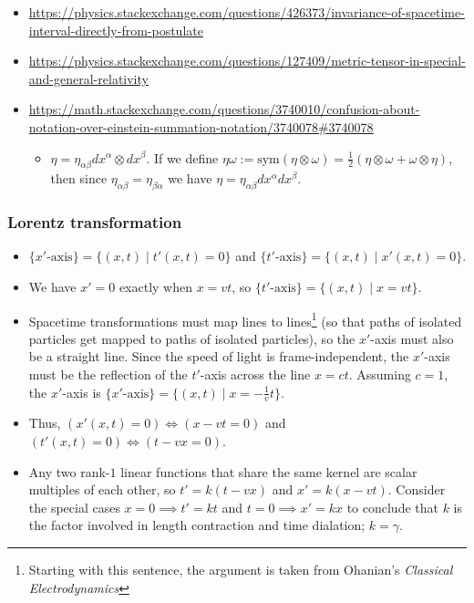 \documentclass{article}
\begin{document}
\begin{itemize}
    \item \url{https://physics.stackexchange.com/questions/426373/invariance-of-spacetime-interval-directly-from-postulate}
    \item \url{https://physics.stackexchange.com/questions/127409/metric-tensor-in-special-and-general-relativity}
    \item \url{https://math.stackexchange.com/questions/3740010/confusion-about-notation-over-einstein-summation-notation/3740078#3740078}
    \begin{itemize}
        \item $\eta = \eta_{\alpha \beta} dx^\alpha \otimes dx^\beta$. If we define $\eta \omega := \text{sym}(\eta \otimes \omega) = \frac{1}{2}(\eta \otimes \omega + \omega \otimes \eta)$, then since $\eta_{\alpha \beta} = \eta_{\beta \alpha}$ we have $\eta = \eta_{\alpha \beta} dx^\alpha dx^\beta$.
    \end{itemize}
\end{itemize}

\subsubsection*{Lorentz transformation}

\begin{itemize}
    \item $\{\text{$x'$-axis}\} = \{(x, t) \mid t'(x, t) = 0\}$ and $\{\text{$t'$-axis}\} = \{(x, t) \mid x'(x, t) = 0\}$. 
    \item We have $x' = 0$ exactly when $x = vt$, so $\{\text{$t'$-axis}\} = \{(x, t) \mid x = vt\}$.
    \item Spacetime transformations must map lines to lines\footnote{Starting with this sentence, the argument is taken from Ohanian's \textit{Classical Electrodynamics}} (so that paths of isolated particles get mapped to paths of isolated particles), so the $x'$-axis must also be a straight line. Since the speed of light is frame-independent, the $x'$-axis must be the reflection of the $t'$-axis across the line $x = ct$. Assuming $c = 1$, the $x'$-axis is $\{\text{$x'$-axis}\} = \{(x, t) \mid x = -\frac{1}{v}t \}$.
    \item Thus, $(x'(x, t) = 0) \iff (x - vt = 0)$ and $(t'(x, t) = 0) \iff (t - vx = 0)$.
    \item Any two rank-$1$ linear functions that share the same kernel are scalar multiples of each other, so $t' = k(t - vx)$ and $x' = k(x - vt)$. Consider the special cases $x = 0 \implies t' = kt$ and $t = 0 \implies x' = kx$ to conclude that $k$ is the factor involved in length contraction and time dialation; $k = \gamma$.
\end{itemize}
\end{document}
